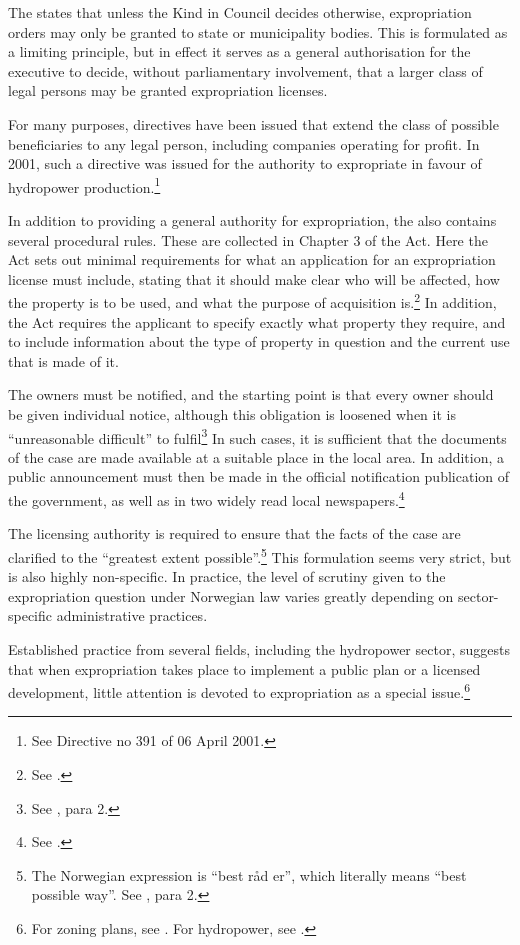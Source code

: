 The \cite{ea59} states that unless the Kind in Council decides otherwise, expropriation orders may only be granted to state or municipality bodies. This is formulated as a limiting principle, but in effect it serves as a general authorisation for the executive to decide, without parliamentary involvement, that a larger class of legal persons may be granted expropriation licenses. 

For many purposes, directives have been issued that extend the class of possible beneficiaries to any legal person, including companies operating for profit. In 2001, such a directive was issued for the authority to expropriate in favour of hydropower production.\footnote{See Directive no 391 of 06 April 2001.} 

In addition to providing a general authority for expropriation, the \cite{ea59} also contains several procedural rules. These are collected in Chapter 3 of the Act. Here the Act sets out minimal requirements for what an application for an expropriation license must include, stating that it should make clear who will be affected, how the property is to be used, and what the purpose of acquisition is.\footnote{See \cite[11]{ea59}.} In addition, the Act requires the applicant to specify exactly what property they require, and to include information about the type of property in question and the current use that is made of it.

The owners must be notified, and the starting point is that every owner should be given individual notice, although this obligation is loosened when it is ``unreasonable difficult'' to fulfil\footnote{See \cite[12]{ea59}, para 2.} In such cases, it is sufficient that the documents of the case are made available at a suitable place in the local area. In addition, a public announcement must then  be made in the official notification publication of the government, as well as in two widely read local newspapers.\footnote{See \cite[12]{ea59}.}

The licensing authority is required to ensure that the facts of the case are clarified to the ``greatest extent possible''.\footnote{The Norwegian expression is ``best råd er'', which literally means ``best possible way''. See \cite[12]{ea59}, para 2.} This formulation seems very strict, but is also highly non-specific. In practice, the level of scrutiny given to the expropriation question under Norwegian law varies greatly depending on sector-specific administrative practices.  

Established practice from several fields, including the hydropower sector, suggests that when expropriation takes place to implement a public plan or a licensed development, little attention is devoted to expropriation as a special issue.\footnote{For zoning plans, see \cite{namsos98,bo99}. For hydropower, see \cite{jorpeland11}.}

